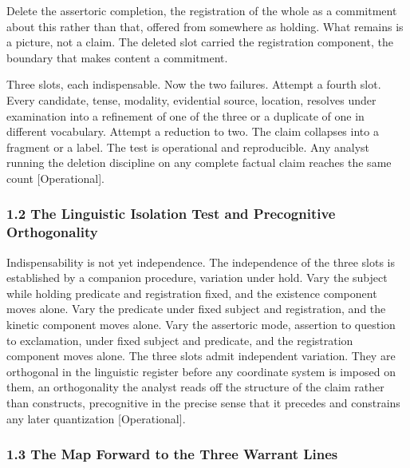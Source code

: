 \documentclass[10pt,twocolumn]{article}
\begin{document}
Delete the assertoric completion, the registration of the whole as a
commitment about this rather than that, offered from somewhere as
holding. What remains is a picture, not a claim. The deleted slot
carried the registration component, the boundary that makes content a
commitment.

Three slots, each indispensable. Now the two failures. Attempt a fourth
slot. Every candidate, tense, modality, evidential source, location,
resolves under examination into a refinement of one of the three or a
duplicate of one in different vocabulary. Attempt a reduction to two.
The claim collapses into a fragment or a label. The test is operational
and reproducible. Any analyst running the deletion discipline on any
complete factual claim reaches the same count {[}Operational{]}.

\hypertarget{the-linguistic-isolation-test-and-precognitive-orthogonality}{%
\subsubsection{1.2 The Linguistic Isolation Test and Precognitive
Orthogonality}\label{the-linguistic-isolation-test-and-precognitive-orthogonality}}

Indispensability is not yet independence. The independence of the three
slots is established by a companion procedure, variation under hold.
Vary the subject while holding predicate and registration fixed, and the
existence component moves alone. Vary the predicate under fixed subject
and registration, and the kinetic component moves alone. Vary the
assertoric mode, assertion to question to exclamation, under fixed
subject and predicate, and the registration component moves alone. The
three slots admit independent variation. They are orthogonal in the
linguistic register before any coordinate system is imposed on them, an
orthogonality the analyst reads off the structure of the claim rather
than constructs, precognitive in the precise sense that it precedes and
constrains any later quantization {[}Operational{]}.

\hypertarget{the-map-forward-to-the-three-warrant-lines}{%
\subsubsection{1.3 The Map Forward to the Three Warrant
Lines}\label{the-map-forward-to-the-three-warrant-lines}}
\end{document}
